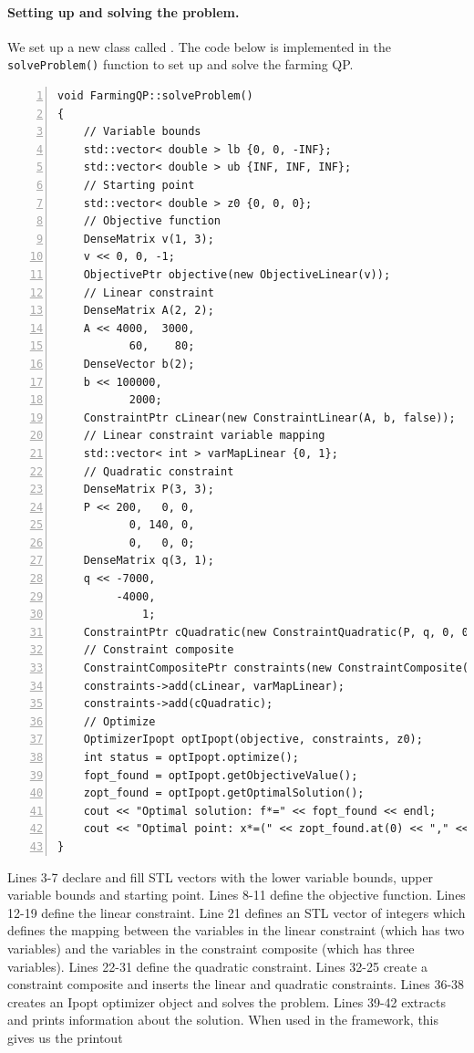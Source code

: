 \paragraph{Setting up and solving the problem.}
We set up a new  class called . The code below is implemented in the \texttt{solveProblem()} function to set up and solve the farming QP.
\begin{lstlisting}[numbers=left]
void FarmingQP::solveProblem()
{
	// Variable bounds
    std::vector< double > lb {0, 0, -INF};
    std::vector< double > ub {INF, INF, INF};
    // Starting point
    std::vector< double > z0 {0, 0, 0};
    // Objective function
    DenseMatrix v(1, 3);
    v << 0, 0, -1;
    ObjectivePtr objective(new ObjectiveLinear(v));
    // Linear constraint
    DenseMatrix A(2, 2);
    A << 4000,  3000,
           60,    80;
    DenseVector b(2);
    b << 100000,
           2000;
    ConstraintPtr cLinear(new ConstraintLinear(A, b, false));
    // Linear constraint variable mapping
    std::vector< int > varMapLinear {0, 1};
    // Quadratic constraint
    DenseMatrix P(3, 3);
    P << 200,   0, 0,
           0, 140, 0,
           0,   0, 0;
    DenseMatrix q(3, 1);
    q << -7000,
         -4000,
             1;
    ConstraintPtr cQuadratic(new ConstraintQuadratic(P, q, 0, 0, 0));
    // Constraint composite
    ConstraintCompositePtr constraints(new ConstraintComposite(3, lb, ub));
    constraints->add(cLinear, varMapLinear);
    constraints->add(cQuadratic);
    // Optimize
    OptimizerIpopt optIpopt(objective, constraints, z0);
    int status = optIpopt.optimize();
    fopt_found = optIpopt.getObjectiveValue();
    zopt_found = optIpopt.getOptimalSolution();
    cout << "Optimal solution: f*=" << fopt_found << endl;
    cout << "Optimal point: x*=(" << zopt_found.at(0) << "," << zopt_found.at(1) << "," << zopt_found.at(2) << ")" << endl;
}
\end{lstlisting}
Lines 3-7 declare and fill STL vectors with the lower variable bounds, upper variable bounds and starting point. Lines 8-11 define the objective function. Lines 12-19 define the linear constraint. Line 21 defines an STL vector of integers which defines the mapping between the variables in the linear constraint (which has two variables) and the variables in the constraint composite (which has three variables). Lines 22-31 define the quadratic constraint. Lines 32-25 create a constraint composite and inserts the linear and quadratic constraints. Lines 36-38 creates an Ipopt optimizer object and solves the problem. Lines 39-42 extracts and prints information about the solution. When used in the  framework, this gives us the printout
